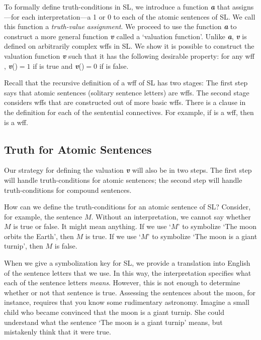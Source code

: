 {{{\color{black}To formally define truth-conditions in SL, we introduce a function \textit{\textbf{a}} that assigns---for each interpretation---a 1 or 0 to each of the atomic sentences of SL. We call this function a \textit{truth-value assignment}. We proceed to use the function \textit{\textbf{a}} to construct a more general function \textit{\textbf{v}} called a `valuation function'. Unlike \textit{\textbf{a}}, \textit{\textbf{v}} is defined on arbitrarily complex wffs in SL. We show it is possible to construct the valuation function \textit{\textbf{v}} such that it has the following desirable property:} for any wff \metaA{}, \textit{\textbf{v}}(\metaA{})$=1$ if \metaA{} is true and \textit{\textbf{v}}(\metaA{})$=0$ if \metaA{} is false. 


Recall that the recursive definition of a wff of SL has two stages: The first step says that atomic sentences (solitary sentence letters) are wffs. The second stage considers wffs that are constructed out of more basic wffs. There is a clause in the definition for each of the sentential connectives. For example, if \metaA{} is a wff, then \enot\metaA{} is a wff.

\subsection{Truth for Atomic Sentences}

Our strategy for defining the valuation \textit{\textbf{v}} will also be in two steps. The first step will handle truth-conditions for atomic sentences; the second step will handle truth-conditions for compound sentences.

How can we define the truth-conditions for an atomic sentence of SL? Consider, for example, the sentence $M$. Without an interpretation, we cannot say whether $M$ is true or false. It might mean anything. If we use `$M$' to symbolize `The moon orbits the Earth', then $M$ is true. If we use `$M$' to symbolize `The moon is a giant turnip', then $M$ is false.

When we give a symbolization key for SL, we provide a translation into English of the sentence letters that we use. In this way, the interpretation specifies what each of the sentence letters \emph{means}. However, this is not enough to determine whether or not that sentence is true. Assessing the sentences about the moon, for instance, requires that you know some rudimentary astronomy. Imagine a small child who became convinced that the moon is a giant turnip. She could understand what the sentence `The moon is a giant turnip' means, but mistakenly think that it were true.

}}
